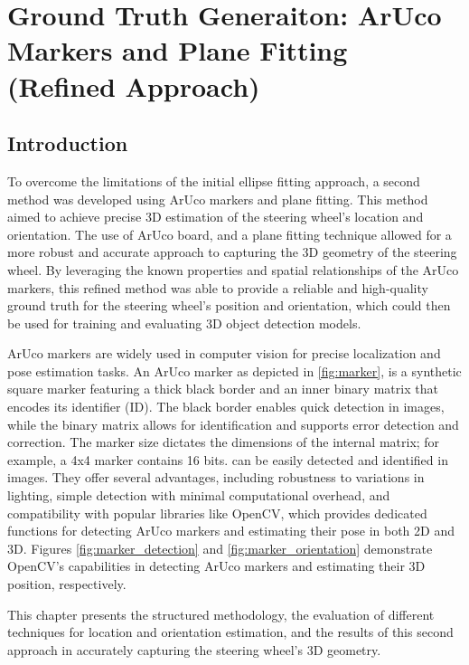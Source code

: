 \chapter{Ground Truth Generaiton: ArUco Markers and Plane Fitting (Refined Approach)}

\section{Introduction}
To overcome the limitations of the initial ellipse fitting 
approach, a second method was developed using ArUco markers and 
plane fitting. This method aimed to achieve precise 3D 
estimation of the steering wheel's location and orientation. 
The use of ArUco board, and a plane fitting technique allowed 
for a more robust and accurate approach to capturing the 3D 
geometry of the steering wheel. By leveraging the known 
properties and spatial relationships of the ArUco markers, 
this refined method was able to provide a reliable and 
high-quality ground truth for the steering wheel's position 
and orientation, which could then be used for training and 
evaluating 3D object detection models.


ArUco markers \cite{opencv_aruco_detection} are widely used  in 
computer vision for precise localization and pose estimation 
tasks.  An ArUco marker as depicted in \cref{fig:marker}, is a 
synthetic square marker featuring a  thick black border and an 
inner binary matrix that encodes  its identifier (ID). The black 
border enables quick detection  in images, while the binary 
matrix allows for identification  and supports error detection 
and correction.  The marker size dictates the dimensions of the 
internal matrix;  for example, a 4x4 marker contains 16 bits. 
can be easily  detected and identified in images.  They offer 
several advantages, including robustness to  variations in 
lighting, simple detection with minimal  computational overhead, 
and compatibility with popular  libraries like OpenCV, which 
provides dedicated functions for detecting ArUco markers and 
estimating their pose in both 2D  and 3D. Figures \cref{fig:marker_detection} and \cref{fig:marker_orientation} 
demonstrate OpenCV's capabilities in detecting ArUco markers and 
estimating their 3D position, respectively. 

This chapter presents the structured methodology, the evaluation 
of different techniques for location and orientation estimation, 
and the results of this second approach in accurately capturing 
the steering wheel’s 3D geometry.

